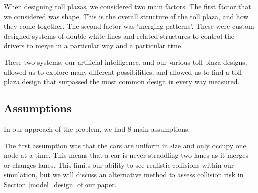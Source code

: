 \documentclass[a4paper, 11pt]{article}
\begin{document}
When designing toll plazas, we considered two main factors. The first factor that we considered was shape. This is the overall structure of the toll plaza, and how they come together. The second factor was `merging patterns'. These were custom designed systems of double white lines and related structures to control the drivers to merge in a particular way and a particular time. 

These two systems, our artificial intelligence, and our various toll plaza designs, allowed us to explore many different possibilities, and allowed us to find a toll plaza design that surpassed the most common design in every way measured. 





\subsection{Assumptions}

In our approach of the problem, we had 8 main assumptions.

The first assumption was that the cars are uniform in size and only occupy one node at a time. This means that a car is never straddling two lanes as it merges or changes lanes. This limits our ability to see realistic collisions within our simulation, but we will discuss an alternative method to assess collision risk in Section \ref{model_design} of our paper.
\end{document}

